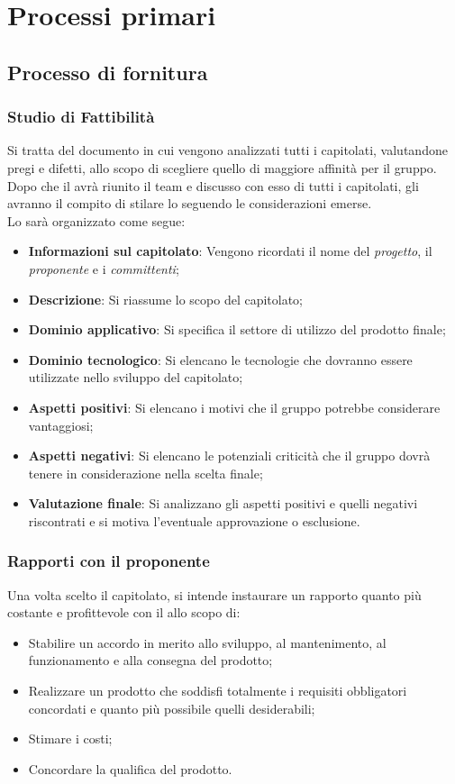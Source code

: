 \section{Processi primari}
\subsection{Processo di fornitura}

\subsubsection{Studio di Fattibilità}
Si tratta del documento in cui vengono analizzati tutti i capitolati, valutandone pregi e difetti, allo scopo di scegliere quello di maggiore affinità per il gruppo.
Dopo che il \RdP{} avrà riunito il team e discusso con esso di tutti i capitolati, gli \anas{} avranno il compito di stilare lo \SdF{} seguendo le considerazioni emerse.\\
Lo \SdF{} sarà organizzato come segue:
\begin{itemize}
	\item \textbf{Informazioni sul capitolato}:
	Vengono ricordati il nome del \emph{progetto}, il \textit{proponente} e i \textit{committenti};
	\item \textbf{Descrizione}:
	Si riassume lo scopo del capitolato;
	\item \textbf{Dominio applicativo}:
	Si specifica il settore di utilizzo del prodotto finale;
	\item \textbf{Dominio tecnologico}:
	Si elencano le tecnologie che dovranno essere utilizzate nello sviluppo del capitolato;
	\item \textbf{Aspetti positivi}:
	Si elencano i motivi che il gruppo potrebbe considerare vantaggiosi;
	\item \textbf{Aspetti negativi}:
	Si elencano le potenziali criticità che il gruppo dovrà tenere in considerazione nella scelta finale;
	\item \textbf{Valutazione finale}:
	Si analizzano gli aspetti positivi e quelli negativi riscontrati e si motiva l'eventuale approvazione o esclusione.
\end{itemize}

\subsubsection{Rapporti con il proponente}
Una volta scelto il capitolato, si intende instaurare un rapporto quanto più costante e profittevole con il \proponente{} allo scopo di:
\begin{itemize}
	\item Stabilire un accordo in merito allo sviluppo, al mantenimento, al funzionamento e alla consegna del prodotto;
	\item Realizzare un prodotto che soddisfi totalmente i requisiti obbligatori concordati e quanto più possibile quelli desiderabili;
	\item Stimare i costi;
	\item Concordare la qualifica del prodotto.
\end{itemize}

